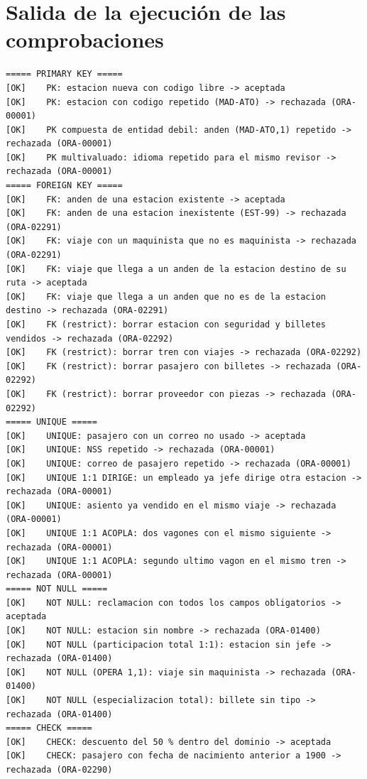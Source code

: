 \documentclass[11pt,a4paper]{article}
\DeclareRobustCommand{\_}{\textunderscore\allowbreak}
\begin{document}
\section{Salida de la ejecución de las comprobaciones}
\label{ap:salida}
\begin{lstlisting}[basicstyle=\ttfamily\scriptsize]
===== PRIMARY KEY =====
[OK]    PK: estacion nueva con codigo libre -> aceptada
[OK]    PK: estacion con codigo repetido (MAD-ATO) -> rechazada (ORA-00001)
[OK]    PK compuesta de entidad debil: anden (MAD-ATO,1) repetido -> rechazada (ORA-00001)
[OK]    PK multivaluado: idioma repetido para el mismo revisor -> rechazada (ORA-00001)
===== FOREIGN KEY =====
[OK]    FK: anden de una estacion existente -> aceptada
[OK]    FK: anden de una estacion inexistente (EST-99) -> rechazada (ORA-02291)
[OK]    FK: viaje con un maquinista que no es maquinista -> rechazada (ORA-02291)
[OK]    FK: viaje que llega a un anden de la estacion destino de su ruta -> aceptada
[OK]    FK: viaje que llega a un anden que no es de la estacion destino -> rechazada (ORA-02291)
[OK]    FK (restrict): borrar estacion con seguridad y billetes vendidos -> rechazada (ORA-02292)
[OK]    FK (restrict): borrar tren con viajes -> rechazada (ORA-02292)
[OK]    FK (restrict): borrar pasajero con billetes -> rechazada (ORA-02292)
[OK]    FK (restrict): borrar proveedor con piezas -> rechazada (ORA-02292)
===== UNIQUE =====
[OK]    UNIQUE: pasajero con un correo no usado -> aceptada
[OK]    UNIQUE: NSS repetido -> rechazada (ORA-00001)
[OK]    UNIQUE: correo de pasajero repetido -> rechazada (ORA-00001)
[OK]    UNIQUE 1:1 DIRIGE: un empleado ya jefe dirige otra estacion -> rechazada (ORA-00001)
[OK]    UNIQUE: asiento ya vendido en el mismo viaje -> rechazada (ORA-00001)
[OK]    UNIQUE 1:1 ACOPLA: dos vagones con el mismo siguiente -> rechazada (ORA-00001)
[OK]    UNIQUE 1:1 ACOPLA: segundo ultimo vagon en el mismo tren -> rechazada (ORA-00001)
===== NOT NULL =====
[OK]    NOT NULL: reclamacion con todos los campos obligatorios -> aceptada
[OK]    NOT NULL: estacion sin nombre -> rechazada (ORA-01400)
[OK]    NOT NULL (participacion total 1:1): estacion sin jefe -> rechazada (ORA-01400)
[OK]    NOT NULL (OPERA 1,1): viaje sin maquinista -> rechazada (ORA-01400)
[OK]    NOT NULL (especializacion total): billete sin tipo -> rechazada (ORA-01400)
===== CHECK =====
[OK]    CHECK: descuento del 50 % dentro del dominio -> aceptada
[OK]    CHECK: pasajero con fecha de nacimiento anterior a 1900 -> rechazada (ORA-02290)

\end{lstlisting}
\end{document}
